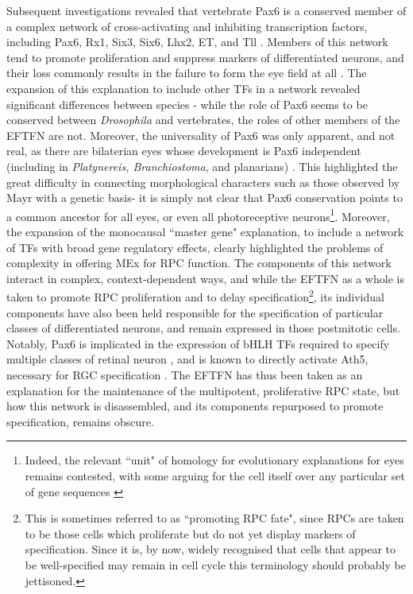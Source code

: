 Subsequent investigations revealed that vertebrate Pax6 is a conserved member of a complex network of cross-activating and inhibiting transcription factors, including Pax6, Rx1, Six3, Six6, Lhx2, ET, and Tll \cite{Zuber2003}. Members of this network tend to promote proliferation and suppress markers of differentiated neurons, and their loss commonly results in the failure to form the eye field at all \cite{Agathocleous2009}. The expansion of this explanation to include other TFs in a network revealed significant differences between species \cite{Wagner2007}- while the role of Pax6 seems to be conserved between \textit{Drosophila} and vertebrates, the roles of other members of the EFTFN are not. Moreover, the universality of Pax6 was only apparent, and not real, as there are bilaterian eyes whose development is Pax6 independent (including in \textit{Platynereis, Branchiostoma}, and planarians) \cite{Kozmik2008}. This highlighted the great difficulty in connecting morphological characters such as those observed by Mayr with a genetic basis- it is simply not clear that Pax6 conservation points to a common ancestor for all eyes, or even all photoreceptive neurons\footnote{Indeed, the relevant ``unit" of homology for evolutionary explanations for eyes remains contested, with some arguing for the cell itself over any particular set of gene sequences \cite{Erclik2009}}. Moreover, the expansion of the monocausal ``master gene" explanation, to include a network of TFs with broad gene regulatory effects, clearly highlighted the problems of complexity in offering MEx for RPC function. The components of this network interact in complex, context-dependent ways, and while the EFTFN as a whole is taken to promote RPC proliferation and to delay specification\footnote{This is sometimes referred to as ``promoting RPC fate", since RPCs are taken to be those cells which proliferate but do not yet display markers of specification. Since it is, by now, widely recognised that cells that appear to be well-specified may remain in cell cycle \cite{Godinho2007,Engerer2017} this terminology should probably be jettisoned.}, its individual components have also been held responsible for the specification of particular classes of differentiated neurons, and remain expressed in those postmitotic cells. Notably, Pax6 is implicated in the expression of bHLH TFs required to specify multiple classes of retinal neuron \cite{Marquardt2001}, and is known to directly activate Ath5, necessary for RGC specification \cite{Willardsen2009}. The EFTFN has thus been taken as an explanation for the maintenance of the multipotent, proliferative RPC state, but how this network is disassembled, and its components repurposed to promote specification, remains obscure.

